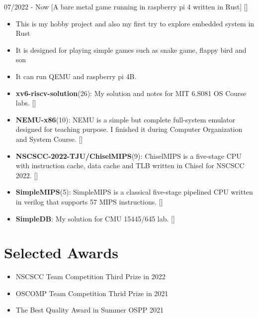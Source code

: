 \documentclass{chicv}
\begin{document}
  {07/2022 - Now}
  [A bare metal game running in raspberry pi 4 written in Rust]
  []
  \begin{itemize}
    \item This is my hobby project and also my first try to explore embedded system in Rust 
    \item It is designed for playing simple games such as snake game, flappy bird and son 
    \item It can run QEMU and raspberry pi 4B.
  \end{itemize}

  \begin{itemize}
    \item \textbf{xv6-riscv-solution}(26):
    {\small My solution and notes for MIT 6.S081 OS Course labs.} []
    \item \textbf{NEMU-x86}(10):
    {\small NEMU is a simple but complete full-system emulator designed for teaching purpose. I finished it during Computer Organization and System Course.}  []
    \item \textbf{NSCSCC-2022-TJU/ChiselMIPS}(9):
    {\small ChiselMIPS is a five-stage CPU with instruction cache, data cache and TLB written in Chisel for NSCSCC 2022.} []
    \item \textbf{SimpleMIPS}(5):
    {\small SimpleMIPS is a classical five-stage pipelined CPU written in verilog that supports 57 MIPS instructions. } []
    \item \textbf{SimpleDB}:
    {\small My solution for CMU 15445/645 lab. } []
  \end{itemize}
  

\section{Selected Awards}
\begin{itemize}
  \item NSCSCC Team Competition Third Prize in 2022
  \item OSCOMP Team Competition Thrid Prize in 2021
  \item The Best Quality Award in Summer OSPP 2021
\end{itemize}
\end{document}
